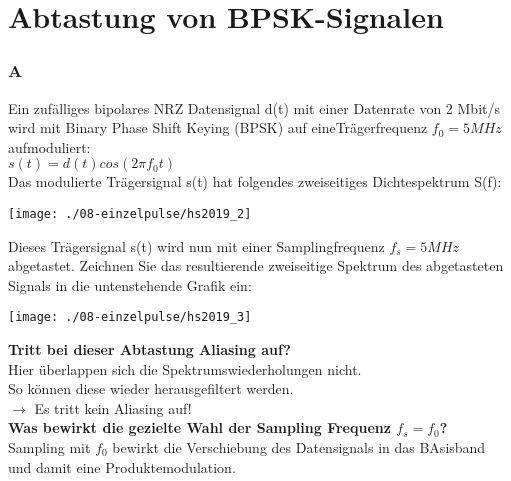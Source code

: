 

\section{Abtastung von BPSK-Signalen}

\subsubsection{A}
Ein zufälliges bipolares NRZ Datensignal d(t) mit einer Datenrate von 2 Mbit/s wird mit Binary Phase Shift Keying (BPSK) auf eineTrägerfrequenz $f_0 = 5 MHz$ aufmoduliert:\\
$s(t)=d(t)cos(2\pi f_0t)$\\

Das modulierte Trägersignal s(t) hat folgendes zweiseitiges Dichtespektrum S(f):\\
\begin{center}
    \vspace{-8pt}
    \texttt{[image: ./08-einzelpulse/hs2019\_2]}
    \vspace{-8pt}
\end{center}

Dieses Trägersignal s(t) wird nun mit einer Samplingfrequenz $f_s = 5 MHz$ abgetastet. Zeichnen Sie das resultierende zweiseitige Spektrum des abgetasteten Signals in die
untenstehende Grafik ein:
\begin{center}
    \vspace{-8pt}
    \texttt{[image: ./08-einzelpulse/hs2019\_3]}
    \vspace{-8pt}
\end{center}

\textbf{Tritt bei dieser Abtastung Aliasing auf?}\\
Hier überlappen sich die Spektrumswiederholungen nicht.\\
So können diese wieder herausgefiltert werden.\\
$\rightarrow$ Es tritt kein Aliasing auf!\\

\textbf{Was bewirkt die gezielte Wahl der Sampling Frequenz $f_s = f_0$?}\\
Sampling mit $f_0$ bewirkt die Verschiebung des Datensignals in das BAsisband und damit eine Produktemodulation.\\

